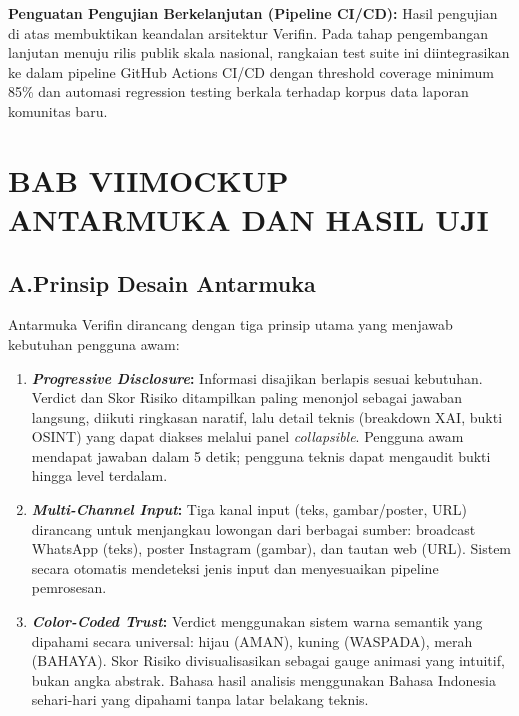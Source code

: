 \documentclass[12pt,a4paper]{article}
\begin{document}
\textbf{Penguatan Pengujian Berkelanjutan (Pipeline CI/CD):} Hasil pengujian di atas membuktikan keandalan
arsitektur Verifin. Pada tahap pengembangan lanjutan menuju rilis publik skala nasional, rangkaian test suite
ini diintegrasikan ke dalam pipeline GitHub Actions CI/CD dengan threshold coverage minimum 85\% dan automasi
regression testing berkala terhadap korpus data laporan komunitas baru.

\section*{BAB VII\quad MOCKUP ANTARMUKA DAN HASIL UJI}

\subsection*{A.\quad Prinsip Desain Antarmuka}

Antarmuka Verifin dirancang dengan tiga prinsip utama yang menjawab kebutuhan pengguna awam:

\begin{enumerate}[label=\textbf{\arabic*.}]
\item \textbf{\textit{Progressive Disclosure}:} Informasi disajikan berlapis sesuai kebutuhan.
Verdict dan Skor Risiko ditampilkan paling menonjol sebagai jawaban langsung, diikuti ringkasan
naratif, lalu detail teknis (breakdown XAI, bukti OSINT) yang dapat diakses melalui panel
\textit{collapsible}. Pengguna awam mendapat jawaban dalam 5 detik; pengguna teknis dapat
mengaudit bukti hingga level terdalam.

\item \textbf{\textit{Multi-Channel Input}:} Tiga kanal input (teks, gambar/poster, URL) dirancang
untuk menjangkau lowongan dari berbagai sumber: broadcast WhatsApp (teks), poster Instagram
(gambar), dan tautan web (URL). Sistem secara otomatis mendeteksi jenis input dan menyesuaikan
pipeline pemrosesan.

\item \textbf{\textit{Color-Coded Trust}:} Verdict menggunakan sistem warna semantik yang
dipahami secara universal: hijau (AMAN), kuning (WASPADA), merah (BAHAYA). Skor Risiko
divisualisasikan sebagai gauge animasi yang intuitif, bukan angka abstrak. Bahasa hasil analisis
menggunakan Bahasa Indonesia sehari-hari yang dipahami tanpa latar belakang teknis.
\end{enumerate}
\end{document}
